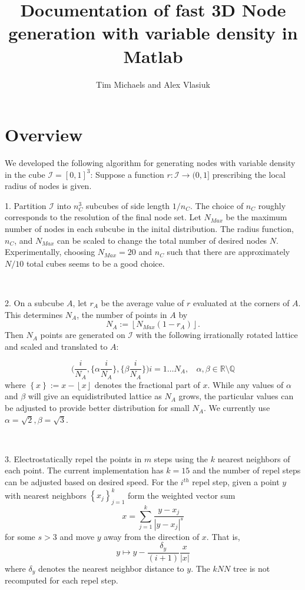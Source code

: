 \documentclass[]{article}
\title{Documentation of fast 3D Node generation with variable density in Matlab}
\author{Tim Michaels and Alex Vlasiuk}
\date{}
\begin{document}
\maketitle

\section{Overview}

We developed the following algorithm for generating nodes with variable density in the cube $\mathcal{I} = [0,1]^3$: Suppose a function $r: \mathcal{I} \to (0,1]$ prescribing the local radius of nodes is given. 

1. Partition $\mathcal{I}$ into $n_C^3$ subcubes of side length $1/n_C$. The choice of $n_C$ roughly corresponds to the resolution of the final node set. Let $N_{Max}$ be the maximum number of nodes in each subcube in the inital distribution. The radius function, $n_C$, and $N_{Max}$ can be scaled to change the total number of desired nodes $N$. Experimentally, choosing $N_{Max} = 20$ and $n_C$ such that there are approximately $N/10$ total cubes seems to be a good choice.

\

2. On a subcube $A$, let $r_A$ be the average value of $r$ evaluated at the corners of $A$. This determines $N_A$, the number of points in $A$ by
\[N_A:= \left\lfloor N_{Max}(1-r_A)\right\rfloor.\]
Then $N_A$ points are generated on $\mathcal{I}$ with the following irrationally rotated lattice and scaled and translated to $A$:

\[\bigg(\frac{i}{N_A}, \bigg\{\alpha\frac{i}{N_A}\bigg\}, \bigg\{\beta\frac{i}{N_A}\bigg\}\bigg)i=1\dots N_A,\ \ \ \  \alpha, \beta\in\mathbb{R}\setminus\mathbb{Q}\]
where $\left\{x\right\}:= x-\left\lfloor x\right\rfloor$ denotes the fractional part of $x$. While any values of $\alpha$ and $\beta$ will give an equidistributed lattice as $N_A$ grows, the particular values can be adjusted to provide better distribution for small $N_A$. We currently use $\alpha = \sqrt{2}, \beta = \sqrt{3}$.

\

3. Electrostatically repel the points in $m$ steps using the $k$ nearest neighbors of each point. The current implementation has $k=15$ and the number of repel steps can be adjusted based on desired speed. For the $i^{th}$ repel step, given a point $y$ with nearest neighbors $\left\{x_j\right\}_{j=1}^k$ form the weighted vector sum
\[x = \sum_{j=1}^{k}\frac{y-x_j}{|y-x_j|^s} \]
for some $s>3$ and move $y$ away from the direction of $x$. That is,
\[y\mapsto y - \frac{\delta_y}{(i+1)}\frac{x}{|x|}\]
where $\delta_y$ denotes the nearest neighbor distance to $y$. The $kNN$ tree is not recomputed for each repel step.
\end{document}
